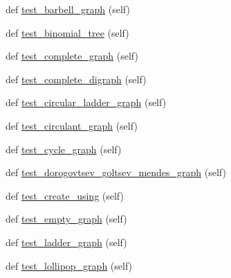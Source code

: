 \begin{DoxyCompactItemize}
\item 
def \hyperlink{classnetworkx_1_1generators_1_1tests_1_1test__classic_1_1TestGeneratorClassic_a4f34ecb704693dc7f791decd36902f82}{test\+\_\+barbell\+\_\+graph} (self)
\item 
def \hyperlink{classnetworkx_1_1generators_1_1tests_1_1test__classic_1_1TestGeneratorClassic_a5c22d5ed486750a9e71be2dbaae29e30}{test\+\_\+binomial\+\_\+tree} (self)
\item 
def \hyperlink{classnetworkx_1_1generators_1_1tests_1_1test__classic_1_1TestGeneratorClassic_af84057a706c3d60ad61cf07a95758505}{test\+\_\+complete\+\_\+graph} (self)
\item 
def \hyperlink{classnetworkx_1_1generators_1_1tests_1_1test__classic_1_1TestGeneratorClassic_a2cd08da7f31d57b2ac8acf1a878d2541}{test\+\_\+complete\+\_\+digraph} (self)
\item 
def \hyperlink{classnetworkx_1_1generators_1_1tests_1_1test__classic_1_1TestGeneratorClassic_a6bc8b6ab5623972a6e9245b4d1df0763}{test\+\_\+circular\+\_\+ladder\+\_\+graph} (self)
\item 
def \hyperlink{classnetworkx_1_1generators_1_1tests_1_1test__classic_1_1TestGeneratorClassic_a0cac8001966aea42ebd5c8c563a872a3}{test\+\_\+circulant\+\_\+graph} (self)
\item 
def \hyperlink{classnetworkx_1_1generators_1_1tests_1_1test__classic_1_1TestGeneratorClassic_af2aa39d026a78a6bb578f5170049a005}{test\+\_\+cycle\+\_\+graph} (self)
\item 
def \hyperlink{classnetworkx_1_1generators_1_1tests_1_1test__classic_1_1TestGeneratorClassic_ab042bb70a777bdfddb11f34fbd92dfd0}{test\+\_\+dorogovtsev\+\_\+goltsev\+\_\+mendes\+\_\+graph} (self)
\item 
def \hyperlink{classnetworkx_1_1generators_1_1tests_1_1test__classic_1_1TestGeneratorClassic_ab31a5b1bbe6dc7155cefa2cab8578629}{test\+\_\+create\+\_\+using} (self)
\item 
def \hyperlink{classnetworkx_1_1generators_1_1tests_1_1test__classic_1_1TestGeneratorClassic_a7ffd9545cd4548125d7693b5641da5fc}{test\+\_\+empty\+\_\+graph} (self)
\item 
def \hyperlink{classnetworkx_1_1generators_1_1tests_1_1test__classic_1_1TestGeneratorClassic_aab7cf70d8e9be13af194748bba59cfda}{test\+\_\+ladder\+\_\+graph} (self)
\item 
def \hyperlink{classnetworkx_1_1generators_1_1tests_1_1test__classic_1_1TestGeneratorClassic_a9ca385d8f9dcc382066b2e4f5c0b7785}{test\+\_\+lollipop\+\_\+graph} (self)
\item 

\end{DoxyCompactItemize}
